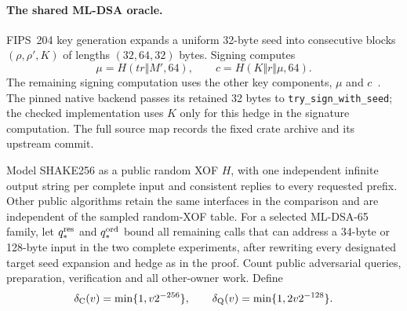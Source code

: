 \paragraph{The shared ML-DSA oracle.}
FIPS~204 key generation expands a uniform 32-byte seed into consecutive
blocks $(\rho,\rho',K)$ of lengths $(32,64,32)$ bytes. Signing computes
\[
 \mu=H(\mathit{tr}\Vert M',64),\qquad
 c=H(K\Vert r\Vert\mu,64).
\]
The remaining signing computation uses the other key components, $\mu$
and $c$~\cite{fips204}. The pinned native backend passes its retained
32 bytes to \texttt{try\_sign\_with\_seed}; the checked implementation
uses $K$ only for this hedge in the signature computation. The full source
map records the fixed crate archive and its upstream commit.

Model SHAKE256 as a public random XOF $H$, with one independent infinite
output string per complete input and consistent replies to every requested
prefix. Other public algorithms retain the same interfaces in the
comparison and are independent of the sampled random-XOF table. For a
selected ML-DSA-65 family, let $q_*^{\rm res}$ and
$q_*^{\rm ord}$ bound all remaining calls that can address a 34-byte or
128-byte input in the two complete experiments, after rewriting every
designated target seed expansion and hedge as in the proof. Count public
adversarial queries, preparation, verification and all other-owner work.
Define
\[
 \delta_{\rm C}(v)=\min\{1,v2^{-256}\},\qquad
 \delta_{\rm Q}(v)=\min\{1,2v2^{-128}\}.
\]

